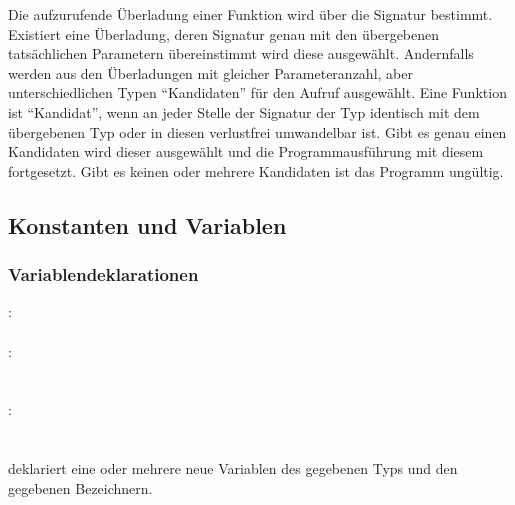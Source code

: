 Die aufzurufende Überladung einer Funktion wird über die Signatur bestimmt. Existiert
eine Überladung, deren Signatur genau mit den übergebenen tatsächlichen Parametern
übereinstimmt wird diese ausgewählt. Andernfalls werden aus den Überladungen mit
gleicher Parameteranzahl, aber unterschiedlichen Typen "`Kandidaten"' für den
Aufruf ausgewählt. Eine Funktion ist "`Kandidat"', wenn an jeder Stelle der Signatur
der Typ identisch mit dem übergebenen Typ oder in diesen verlustfrei umwandelbar ist.
Gibt es genau einen Kandidaten wird dieser ausgewählt und die Programmausführung
mit diesem fortgesetzt. Gibt es keinen oder mehrere Kandidaten ist das Programm
ungültig.


\subsection{Konstanten und Variablen}\label{Konstanten und Variablen}
\subsubsection{Variablendeklarationen}\label{Variablendeklarationen}
:\label{dekl_var}\\
\hspace*{1cm}   \\
:\label{dekl_var_bzch_init_liste}\\
\hspace*{1cm} \\
\hspace*{1cm} \glq\Gt{,}\grq  {} \\
:\label{dekl_var_bzch_init}\\
\hspace*{1cm} \\
\hspace*{1cm} \glq\Gt{=}\grq  {} \\

 deklariert eine oder mehrere neue Variablen des gegebenen Typs und den gegebenen Bezeichnern.

